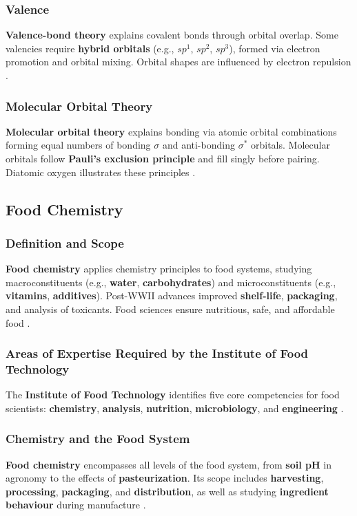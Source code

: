 \subsubsection*{Valence}
\textbf{Valence-bond theory} explains covalent bonds through orbital overlap. Some valencies require \textbf{hybrid orbitals} (e.g., \textbf{$sp^1$}, \textbf{$sp^2$}, \textbf{$sp^3$}), formed via electron promotion and orbital mixing. Orbital shapes are influenced by electron repulsion \cite*{BKR_01}.

\subsubsection*{Molecular Orbital Theory}
\textbf{Molecular orbital theory} explains bonding via atomic orbital combinations forming equal numbers of bonding $\sigma$ and anti-bonding $\sigma^*$ orbitals. Molecular orbitals follow \textbf{Pauli's exclusion principle} and fill singly before pairing. Diatomic oxygen illustrates these principles \cite*{BKR_01}.

\subsection*{Food Chemistry}
\subsubsection*{Definition and Scope}
\textbf{Food chemistry} applies chemistry principles to food systems, studying macroconstituents (e.g., \textbf{water}, \textbf{carbohydrates}) and microconstituents (e.g., \textbf{vitamins}, \textbf{additives}). Post-WWII advances improved \textbf{shelf-life}, \textbf{packaging}, and analysis of toxicants. Food sciences ensure nutritious, safe, and affordable food \cite*{BKR_01}.

\subsubsection*{Areas of Expertise Required by the Institute of Food Technology}
The \textbf{Institute of Food Technology} identifies five core competencies for food scientists: \textbf{chemistry}, \textbf{analysis}, \textbf{nutrition}, \textbf{microbiology}, and \textbf{engineering} \cite*{BKR_01}.

\subsubsection*{Chemistry and the Food System}
\textbf{Food chemistry} encompasses all levels of the food system, from \textbf{soil pH} in agronomy to the effects of \textbf{pasteurization}. Its scope includes \textbf{harvesting}, \textbf{processing}, \textbf{packaging}, and \textbf{distribution}, as well as studying \textbf{ingredient behaviour} during manufacture \cite*{BKR_01}.

